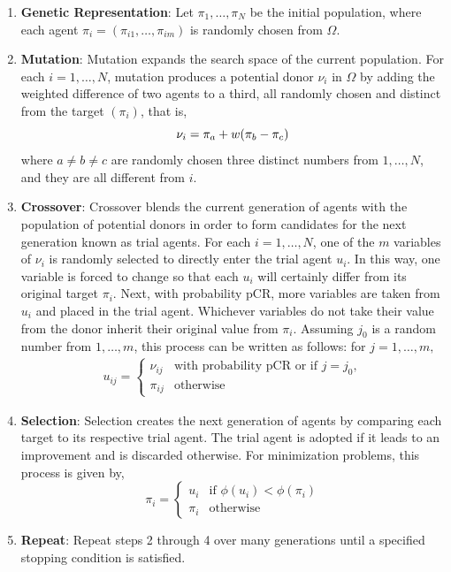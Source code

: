 \documentclass [PhD] {package/uclathes}
\begin{document}
\begin{enumerate}
    \item \textbf{Genetic Representation}:
    Let $\pi_1, \ldots ,\pi_N$ be the initial population, where each agent $\pi_i = (\pi_{i1},\dots,\pi_{im})$ is randomly chosen from $\Omega$.
    \item \textbf{Mutation}:
    Mutation expands the search space of the current population.
    For each $i = 1, \ldots , N$, mutation produces a potential donor $\nu_i$ in $\Omega$ by adding the weighted difference of two agents to a third,  all randomly chosen and distinct from the target $(\pi_i)$, that is,
    \begin{equation}
        \nu_i = \pi_a + w(\pi_b - \pi_c)\\
        \label{mutation}
    \end{equation}
    where $a \neq b \neq c$ are randomly chosen three distinct numbers from $1,\dots, N$, and they are all different from $i$.
    \item \textbf{Crossover}:
    Crossover blends the current generation of agents with the population of potential donors in order to form candidates for the next generation known as trial agents. For each $i = 1,\dots, N$, one of the $m$ variables of $\nu_i$ is randomly selected to directly enter the trial agent $u_i$. In this way, one variable is forced to change so that each $u_i$ will
    certainly differ from its original target $\pi_i$. Next, with probability pCR, more variables are taken from $u_i$ and placed in the trial agent. Whichever variables do not take their value from the donor inherit their original value from $\pi_i$. Assuming $j_0$ is a random number from $1, \dots, m$, this process can be written as follows: for $j = 1,\dots, m,$
    $$
    \begin{aligned}
    u_{ij} = \begin{cases} \nu_{ij}& \text{with probability pCR}
    \text{ or if } j= j_0,\\ \pi_{ij}& \text{otherwise}\end{cases}
    \end{aligned}
    $$
    \item \textbf{Selection}:
    Selection creates the next generation of agents by comparing each target to its respective trial agent. The trial agent is adopted if it leads to an improvement and is discarded otherwise. For minimization problems, this process is given by,
    $$
    \pi_i = \begin{cases} u_i & \text{if } \phi(u_i) < \phi(\pi_i)\\
    \pi_i &\text{otherwise}  \end{cases}
    $$
    \item \textbf{Repeat}:
    Repeat steps 2 through 4 over many generations until a specified
    stopping condition is satisfied.
\end{enumerate}
\end{document}
